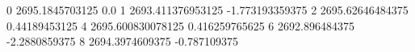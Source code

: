 0 2695.1845703125 0.0
1 2693.411376953125 -1.773193359375
2 2695.62646484375 0.44189453125
4 2695.600830078125 0.416259765625
6 2692.896484375 -2.2880859375
8 2694.3974609375 -0.787109375
